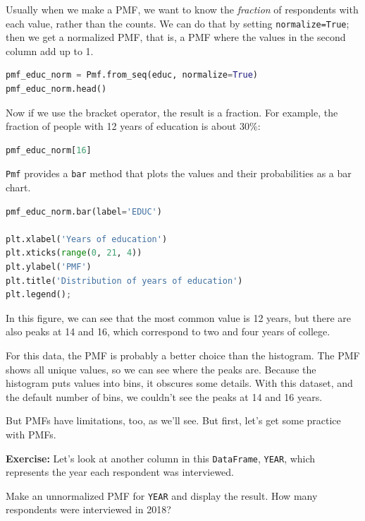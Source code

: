 Usually when we make a PMF, we want to know the \emph{fraction} of
respondents with each value, rather than the counts. We can do that by
setting \passthrough{\lstinline!normalize=True!}; then we get a
normalized PMF, that is, a PMF where the values in the second column add
up to 1.

\begin{lstlisting}[language=Python,style=source]
pmf_educ_norm = Pmf.from_seq(educ, normalize=True)
pmf_educ_norm.head()
\end{lstlisting}

Now if we use the bracket operator, the result is a fraction. For
example, the fraction of people with 12 years of education is about
30\%:

\begin{lstlisting}[language=Python,style=source]
pmf_educ_norm[16]
\end{lstlisting}

\passthrough{\lstinline!Pmf!} provides a \passthrough{\lstinline!bar!}
method that plots the values and their probabilities as a bar chart.

\begin{lstlisting}[language=Python,style=source]
pmf_educ_norm.bar(label='EDUC')

plt.xlabel('Years of education')
plt.xticks(range(0, 21, 4))
plt.ylabel('PMF')
plt.title('Distribution of years of education')
plt.legend();
\end{lstlisting}

In this figure, we can see that the most common value is 12 years, but
there are also peaks at 14 and 16, which correspond to two and four
years of college.

For this data, the PMF is probably a better choice than the histogram.
The PMF shows all unique values, so we can see where the peaks are.
Because the histogram puts values into bins, it obscures some details.
With this dataset, and the default number of bins, we couldn't see the
peaks at 14 and 16 years.

But PMFs have limitations, too, as we'll see. But first, let's get some
practice with PMFs.

\textbf{Exercise:} Let's look at another column in this
\passthrough{\lstinline!DataFrame!}, \passthrough{\lstinline!YEAR!},
which represents the year each respondent was interviewed.

Make an unnormalized PMF for \passthrough{\lstinline!YEAR!} and display
the result. How many respondents were interviewed in 2018?

